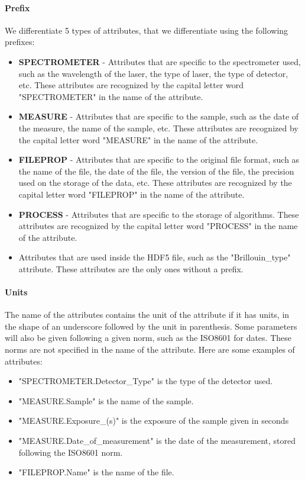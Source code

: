     \paragraph*{Prefix}
    We differentiate 5 types of attributes, that we differentiate using the following prefixes:
    \begin{itemize}
        \item \textbf{SPECTROMETER} - Attributes that are specific to the spectrometer used, such as the wavelength of the laser, the type of laser, the type of detector, etc. These attributes are recognized by the capital letter word "SPECTROMETER" in the name of the attribute.
        \item \textbf{MEASURE} - Attributes that are specific to the sample, such as the date of the measure, the name of the sample, etc. These attributes are recognized by the capital letter word "MEASURE" in the name of the attribute.
        \item \textbf{FILEPROP} - Attributes that are specific to the original file format, such as the name of the file, the date of the file, the version of the file, the precision used on the storage of the data, etc. These attributes are recognized by the capital letter word "FILEPROP" in the name of the attribute.
        \item \textbf{PROCESS} - Attributes that are specific to the storage of algorithms. These attributes are recognized by the capital letter word "PROCESS" in the name of the attribute.
        \item Attributes that are used inside the HDF5 file, such as the "Brillouin\_type" attribute. These attributes are the only ones without a prefix.
    \end{itemize}

    \paragraph*{Units}
    The name of the attributes contains the unit of the attribute if it has units, in the shape of an underscore followed by the unit in parenthesis. Some parameters will also be given following a given norm, such as the ISO8601 for dates. These norms are not specified in the name of the attribute. Here are some examples of attributes:
    \begin{itemize}
        \item "SPECTROMETER.Detector\_Type" is the type of the detector used.
        \item "MEASURE.Sample" is the name of the sample.
        \item "MEASURE.Exposure\_(s)" is the exposure of the sample given in seconds
        \item "MEASURE.Date\_of\_measurement" is the date of the measurement, stored following the ISO8601 norm.
        \item "FILEPROP.Name" is the name of the file.
    \end{itemize}

